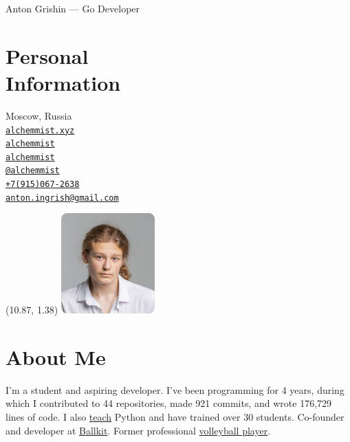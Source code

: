 \documentclass[margin,line]{resume}
\begin{document}
{\vspace*{-13mm}\sc \large Anton Grishin — Go Developer} \\
\begin{resume}

  \begin{minipage}[t]{0.55\textwidth}
    \section{\mysidestyle Personal\\Information}
    Moscow, Russia \\
    \faHome  \space
    \href{https://alchemmist.xyz}{\texttt{alchemmist.xyz}} \\
    \faGithub  \space
    \href{https://github.com/alchemmist/}{\texttt{alchemmist}} \\
    \faLinkedin \space
    \href{https://www.linkedin.com/in/alchemmist/}{\texttt{alchemmist}}
    \\
    \faPaperPlane \space \href{https://t.me/alchemmist}{\texttt{@alchemmist}} \\
    \faPhone \space
    \href{tel:+1234567890}{\color{blue}\texttt{+7(915)067-2638}}  \\
    \faEnvelope \space
    \href{mailto:anton.ingrish@gmail.com}{\color{blue}\texttt{anton.ingrish@gmail.com}}
  \end{minipage}

  \begin{minipage}[H]{0.18\textwidth}
    \begin{textblock}{7}(10.87, 1.38)
      \includegraphics[width=0.270\textwidth]{../images/avatar.png}
    \end{textblock}
  \end{minipage}

  \vspace{-7mm}
  \section{\mysidestyle About Me}
  I'm a student and aspiring developer. I've been programming for 4
  years, during which I contributed to 44 repositories, made 921
  commits, and wrote 176,729 lines of code.
  I also
  \href{https://www.avito.ru/moskva/predlozheniya_uslug/prepodavatel_programmirovaniya_na_python_2556461612}{teach}
  Python and have trained over 30 students. Co-founder and developer
  at \href{https://ballkit.ru/}{Ballkit}. Former professional
  \href{https://alchemmist.github.io/CV/attachments/sport.pdf}{volleyball
  player}.


\end{resume}
\end{document}
